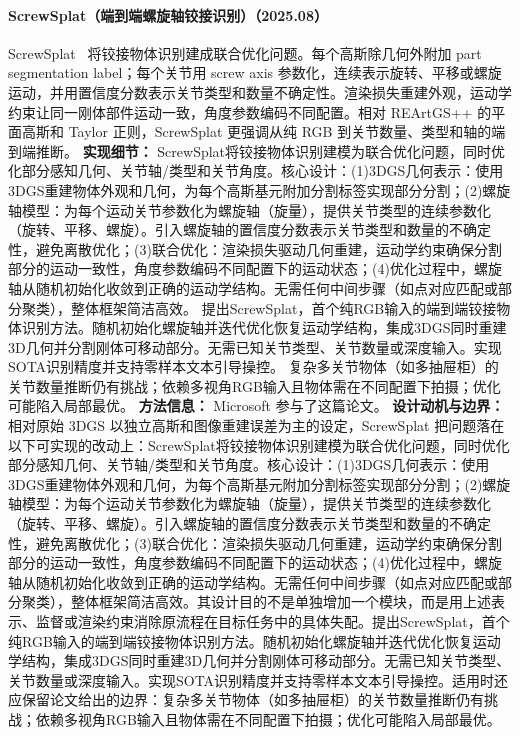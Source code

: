 \paragraph{ScrewSplat（端到端螺旋轴铰接识别）（2025.08）}
ScrewSplat~\cite{2508_02146} 将铰接物体识别建成联合优化问题。每个高斯除几何外附加 part segmentation label；每个关节用 screw axis 参数化，连续表示旋转、平移或螺旋运动，并用置信度分数表示关节类型和数量不确定性。渲染损失重建外观，运动学约束让同一刚体部件运动一致，角度参数编码不同配置。相对 REArtGS++ 的平面高斯和 Taylor 正则，ScrewSplat 更强调从纯 RGB 到关节数量、类型和轴的端到端推断。
\textbf{实现细节：} ScrewSplat将铰接物体识别建模为联合优化问题，同时优化部分感知几何、关节轴/类型和关节角度。核心设计：(1)3DGS几何表示：使用3DGS重建物体外观和几何，为每个高斯基元附加分割标签实现部分分割；(2)螺旋轴模型：为每个运动关节参数化为螺旋轴（旋量），提供关节类型的连续参数化（旋转、平移、螺旋）。引入螺旋轴的置信度分数表示关节类型和数量的不确定性，避免离散优化；(3)联合优化：渲染损失驱动几何重建，运动学约束确保分割部分的运动一致性，角度参数编码不同配置下的运动状态；(4)优化过程中，螺旋轴从随机初始化收敛到正确的运动学结构。无需任何中间步骤（如点对应匹配或部分聚类），整体框架简洁高效。 提出ScrewSplat，首个纯RGB输入的端到端铰接物体识别方法。随机初始化螺旋轴并迭代优化恢复运动学结构，集成3DGS同时重建3D几何并分割刚体可移动部分。无需已知关节类型、关节数量或深度输入。实现SOTA识别精度并支持零样本文本引导操控。 复杂多关节物体（如多抽屉柜）的关节数量推断仍有挑战；依赖多视角RGB输入且物体需在不同配置下拍摄；优化可能陷入局部最优。
\textbf{方法信息：} Microsoft 参与了这篇论文。
\textbf{设计动机与边界：} 相对原始 3DGS 以独立高斯和图像重建误差为主的设定，ScrewSplat 把问题落在以下可实现的改动上：ScrewSplat将铰接物体识别建模为联合优化问题，同时优化部分感知几何、关节轴/类型和关节角度。核心设计：(1)3DGS几何表示：使用3DGS重建物体外观和几何，为每个高斯基元附加分割标签实现部分分割；(2)螺旋轴模型：为每个运动关节参数化为螺旋轴（旋量），提供关节类型的连续参数化（旋转、平移、螺旋）。引入螺旋轴的置信度分数表示关节类型和数量的不确定性，避免离散优化；(3)联合优化：渲染损失驱动几何重建，运动学约束确保分割部分的运动一致性，角度参数编码不同配置下的运动状态；(4)优化过程中，螺旋轴从随机初始化收敛到正确的运动学结构。无需任何中间步骤（如点对应匹配或部分聚类），整体框架简洁高效。其设计目的不是单独增加一个模块，而是用上述表示、监督或渲染约束消除原流程在目标任务中的具体失配。提出ScrewSplat，首个纯RGB输入的端到端铰接物体识别方法。随机初始化螺旋轴并迭代优化恢复运动学结构，集成3DGS同时重建3D几何并分割刚体可移动部分。无需已知关节类型、关节数量或深度输入。实现SOTA识别精度并支持零样本文本引导操控。适用时还应保留论文给出的边界：复杂多关节物体（如多抽屉柜）的关节数量推断仍有挑战；依赖多视角RGB输入且物体需在不同配置下拍摄；优化可能陷入局部最优。

